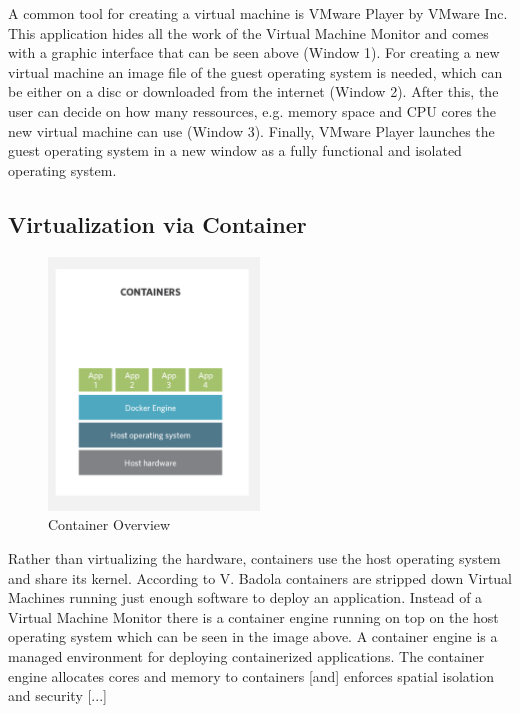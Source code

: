 \documentclass[utf8,biblatex, ngerman, english]{lni}
\begin{document}
A common tool for creating a virtual machine is VMware Player by VMware Inc. This application hides all the work of the Virtual Machine Monitor and comes with a graphic interface that can be seen above (Window 1). For creating a new virtual machine an image file of the guest operating system is needed, which can be either on a disc or downloaded from the internet (Window 2). After this, the user can decide on how many ressources, e.g. memory space and CPU cores the new virtual machine can use (Window 3). Finally, VMware Player launches the guest operating system in a new window as a fully functional and isolated operating system.

\subsection{Virtualization via Container}

\begin{figure}
  \centering
  \includegraphics[width=0.5\textwidth]{Container.pdf}
  \caption{Container Overview}
  \label{img:container}
\end{figure}

Rather than virtualizing the hardware, containers use the host operating system and share its kernel. According to V. Badola containers are stripped down Virtual Machines running just enough software to deploy an application. \cite{Cv15} Instead of a Virtual Machine Monitor there is a container engine running on top on the host operating system which can be seen in the image above. \glqq A container engine is a managed environment for deploying containerized applications. The container engine allocates cores and memory to containers [and] enforces spatial isolation and security [...] \glqq \cite{VC17}
\end{document}
